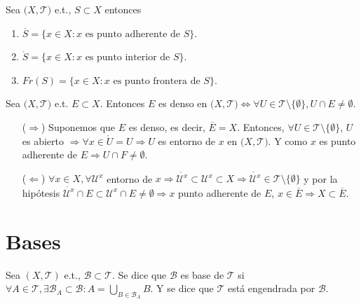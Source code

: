 \begin{cor}
  Sea $\big( X, \mathcal{T} \big)$ e.t., $S \subset X$ entonces
  \begin{enumerate}[label=(\roman*)]
    \item $\overline{S} = \{ x \in X : x \text{ es punto adherente de } S \}$.
    \item $\mathring{S} = \{ x \in X : x \text{ es punto interior de } S \}$.
    \item $Fr(S) = \{ x \in X : x \text{ es punto frontera de } S \}$.
  \end{enumerate}
\end{cor}

\begin{prop}
  Sea $\big( X, \mathcal{T} \big)$ e.t. $E \subset X$. Entonces $ E$ es denso en $\big( X, \mathcal{T} \big) \Leftrightarrow \forall U \in \mathcal{T} \setminus \{ \emptyset \}, U \cap E \neq \emptyset$.
\end{prop}

\begin{dem}
  \begin{enumerate}[label=(\roman*)]
    \item [($\Rightarrow$)] Suponemos que $E$ es denso, es decir, $\overline{E} = X$. Entonces, $\forall U \in \mathcal{T} \setminus \{ \emptyset \}$, $U$ es abierto $\Rightarrow \forall x \in \mathring{U} = U \Rightarrow U$ es entorno de $x$ en $\big( X, \mathcal{T} \big) $. Y como $x$ es punto adherente de $E \Rightarrow U \cap F \neq \emptyset$.
    \item [($\Leftarrow$)] $\forall x \in X, \forall \mathcal{U}^{x}$ entorno de $x \Rightarrow \mathring{\mathcal{U}^{x}} \subset \mathcal{U}^{x} \subset X \Rightarrow \mathring{\mathcal{U}^{x}} \in \mathcal{T} \setminus \{  \emptyset \}$ y por la hipótesis $\mathring{\mathcal{U}^{x}} \cap E \subset \mathcal{U}^{x} \cap E \neq \emptyset \Rightarrow x$ punto adherente de $E$, $x \in \overline{E} \Rightarrow X \subset \overline{E}$.
  \end{enumerate}
\end{dem}

\section{Bases}

\begin{defn}[Base]
  Sea $ ( X, \mathcal{T} )$ e.t., $\mathcal{B} \subset \mathcal{T}$. Se dice que $\mathcal{B}$ es base de $\mathcal{T}$ si $\forall A \in \mathcal{T}, \exists \mathcal{B}_{A} \subset \mathcal{B} : A = \bigcup_{B \in \mathcal{B}_{A}} B$. Y se dice que $\mathcal{T}$ está engendrada por $\mathcal{B}$.
\end{defn}

